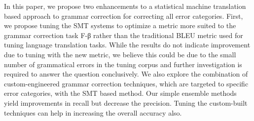 In this paper, we propose two enhancements to a statistical machine translation based approach to grammar correction for correcting all error categories. First, we propose tuning the SMT systems to optimize a metric more suited to the grammar correction task F-β rather than the traditional BLEU metric used for tuning language translation tasks. While the results do not indicate improvement due to tuning with the new metric, we believe this could be due to the small number of grammatical errors in the tuning corpus and further investigation is required to answer the question conclusively. We also explore the combination of custom-engineered grammar correction techniques, which are targeted to specific error categories, with the SMT based method. Our simple ensemble methods yield improvements in recall but decrease the precision. Tuning the custom-built techniques can help in increasing the overall accuracy also.
